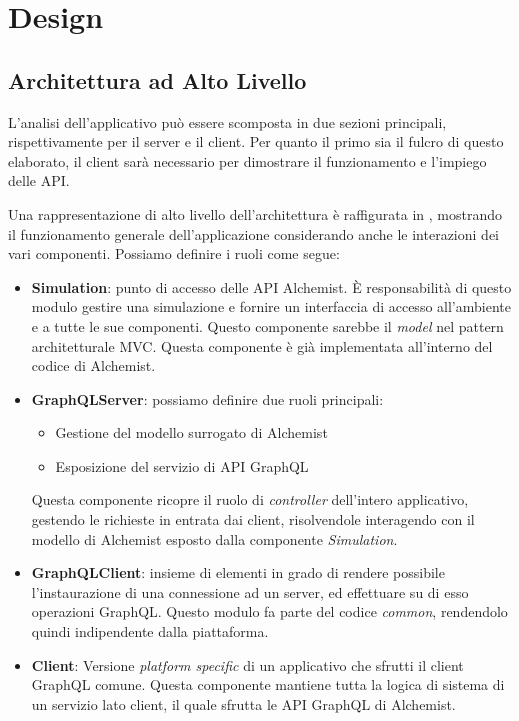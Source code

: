\chapter{Design}\label{chap:design}
\section{Architettura ad Alto Livello}\label{sec:architecture}
L'analisi dell'applicativo può essere scomposta in due sezioni principali, rispettivamente per il server e il client.
Per quanto il primo sia il fulcro di questo elaborato, il client sarà necessario per dimostrare il funzionamento e l'impiego delle API.

Una rappresentazione di alto livello dell'architettura è raffigurata in , mostrando il funzionamento generale dell'applicazione
considerando anche le interazioni dei vari componenti.
Possiamo definire i ruoli come segue:
\begin{itemize}
    \item \textbf{Simulation}: punto di accesso delle API Alchemist. È responsabilità di questo modulo gestire una simulazione e fornire un interfaccia
        di accesso all'ambiente e a tutte le sue componenti. Questo componente sarebbe il \textit{model} nel pattern architetturale \ac{MVC}. Questa
        componente è già implementata all'interno del codice di Alchemist.
    \item \textbf{GraphQLServer}: possiamo definire due ruoli principali: \begin{itemize}
            \item Gestione del modello surrogato di Alchemist
            \item Esposizione del servizio di API GraphQL
        \end{itemize}
        Questa componente ricopre il ruolo di \textit{controller} dell'intero applicativo, gestendo le richieste in entrata dai client, risolvendole
        interagendo con il modello di Alchemist esposto dalla componente \textit{Simulation}.
    \item \textbf{GraphQLClient}: insieme di elementi in grado di rendere possibile l'instaurazione di una connessione ad un server, ed effettuare su
        di esso operazioni GraphQL. Questo modulo fa parte del codice \textit{common}, rendendolo quindi indipendente dalla piattaforma.
    \item \textbf{Client}: Versione \textit{platform specific} di un applicativo che sfrutti il client GraphQL comune. Questa componente mantiene tutta la logica di sistema di un
        servizio lato client, il quale sfrutta le API GraphQL di Alchemist.
\end{itemize}


